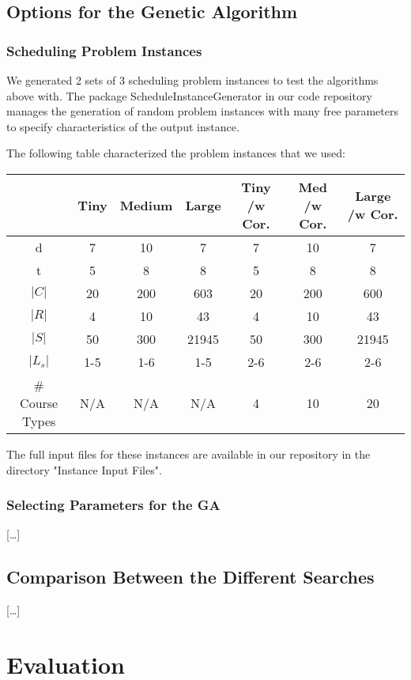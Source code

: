 \documentclass[letterpaper]{article}
\begin{document}
  \subsection{Options for the Genetic Algorithm}
    \subsubsection{Scheduling Problem Instances}
      We generated 2 sets of 3 scheduling problem instances to test the algorithms above with. 
      The package ScheduleInstanceGenerator in our code repository manages the generation of 
      random problem instances with many free parameters to specify characteristics of the 
      output instance.
      
      The following table characterized the problem instances that we used:
      
      \begin{tabular}{|c|c|c|c|c|c|c|}
      \hline  & Tiny & Medium & Large & Tiny /w Cor. & Med /w Cor. & Large /w Cor. \\ 
      \hline d & 7 & 10 & 7 & 7 & 10 & 7 \\ 
      \hline t & 5 & 8 & 8 & 5 & 8 & 8 \\ 
      \hline $|C|$ & 20 & 200 & 603 & 20 & 200 & 600 \\ 
      \hline $|R|$ & 4 & 10 & 43 & 4 & 10 & 43 \\ 
      \hline $|S|$ & 50 & 300 & 21945 & 50 & 300 & 21945 \\ 
      \hline $|L_s|$ & 1-5 & 1-6 & 1-5 & 2-6 & 2-6 & 2-6 \\ 
      \hline \# Course Types & N/A & N/A & N/A & 4 & 10 & 20 \\ 
      \hline 
	\end{tabular} 
	
	  The full input files for these instances are available in our repository in the 
	  directory "Instance Input Files".
	  
    \subsubsection{Selecting Parameters for the GA}
      [\ldots]
  \subsection{Comparison Between the Different Searches}
    [\ldots]
  
\section{Evaluation}
\end{document}
